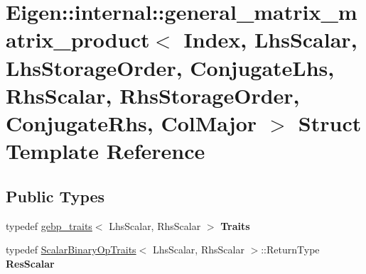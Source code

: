 \hypertarget{struct_eigen_1_1internal_1_1general__matrix__matrix__product_3_01_index_00_01_lhs_scalar_00_01_lc92e3fc5d91273c14187477f2d000bbe}{}\section{Eigen\+::internal\+::general\+\_\+matrix\+\_\+matrix\+\_\+product$<$ Index, Lhs\+Scalar, Lhs\+Storage\+Order, Conjugate\+Lhs, Rhs\+Scalar, Rhs\+Storage\+Order, Conjugate\+Rhs, Col\+Major $>$ Struct Template Reference}
\label{struct_eigen_1_1internal_1_1general__matrix__matrix__product_3_01_index_00_01_lhs_scalar_00_01_lc92e3fc5d91273c14187477f2d000bbe}
\subsection*{Public Types}
\begin{DoxyCompactItemize}
\item 
\mbox{\label{struct_eigen_1_1internal_1_1general__matrix__matrix__product_3_01_index_00_01_lhs_scalar_00_01_lc92e3fc5d91273c14187477f2d000bbe_abc40149462d36992f3d298c17bc33f3f}} 
typedef \mbox{\hyperlink{class_eigen_1_1internal_1_1gebp__traits}{gebp\+\_\+traits}}$<$ Lhs\+Scalar, Rhs\+Scalar $>$ {\bfseries Traits}
\item 
\mbox{\label{struct_eigen_1_1internal_1_1general__matrix__matrix__product_3_01_index_00_01_lhs_scalar_00_01_lc92e3fc5d91273c14187477f2d000bbe_a22f92f3a2a4388d44c9f8194528f37a5}} 
typedef \mbox{\hyperlink{struct_eigen_1_1_scalar_binary_op_traits}{Scalar\+Binary\+Op\+Traits}}$<$ Lhs\+Scalar, Rhs\+Scalar $>$\+::Return\+Type {\bfseries Res\+Scalar}
\end{DoxyCompactItemize}
